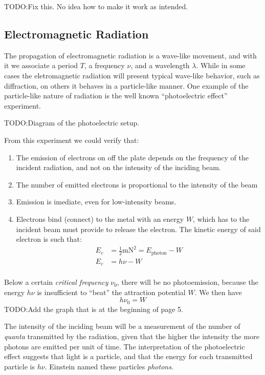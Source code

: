 \documentclass{article}[10pt]
\begin{document}
TODO:\@ Fix this. No idea how to make it work as intended.
\subsection{Electromagnetic Radiation}
The propagation of electromagnetic radiation is a wave-like movement, and with
it we associate a period $T$, a frequency $\nu$, and a wavelength $\lambda$.
While in some cases the eletromagnetic radiation will present typical wave-like
behavior, such as diffraction, on others it behaves in  a particle-like manner.
One example of the particle-like nature of radiation is the well known
``photoelectric effect'' experiment.

TODO:\@ Diagram of the photoelectric setup.

From this experiment we could verify that:
\begin{enumerate}
    \item The emission of electrons on off the plate depends on the frequency of
          the incident radiation, and not on the intensity of the inciding beam.
    \item The number of emitted electrons is proportional to the intensity of
          the beam
    \item Emission is imediate, even for low-intensity beams.
    \item Electrons bind (connect) to the metal with an energy $W$, which has to
          the incident beam must provide to release the electron. The kinetic
          energy of said electron is such that:
          \begin{align*}
              E_c &= \frac{1}{2}\si{\metre\newton}^2 = E_{\text{photon}} - W \\
              E_c &= h\nu - W \\
          \end{align*}
\end{enumerate}
Below a certain \emph{critical frequency} $\nu_0$, there will be no
photoemission, because the energy $h\nu$ is insufficient to ``beat''
the attraction potential $W$. We then have
$$h\nu_0 = W$$
TODO:\@ Add the graph that is at the beginning of page 5.

The intensity of the inciding beam will be a measurement of the number of
\emph{quanta} transmitted by the radiation, given that the higher the intensity
the more photons are emitted per unit of time. The interpretation of the
photoelectric effect suggests that light is a particle, and that the energy for
each transmitted particle is $h\nu$. Einstein named these particles \emph{photons}.
\end{document}
